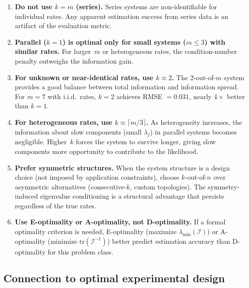 \documentclass[12pt]{article}
\theoremstyle{definition}
\theoremstyle{remark}
\newcommand{\tr}{\mathrm{tr}}
\begin{document}
\begin{enumerate}
  \item \textbf{Do not use $k = m$ (series).}  Series systems are
    non-identifiable for individual rates.  Any apparent estimation
    success from series data is an artifact of the evaluation metric.

  \item \textbf{Parallel ($k = 1$) is optimal only for small systems
    ($m \le 3$) with similar rates.}  For larger~$m$ or heterogeneous
    rates, the condition-number penalty outweighs the information gain.

  \item \textbf{For unknown or near-identical rates, use
    $k \approx 2$.}  The 2-out-of-$m$ system provides a good balance
    between total information and information spread.  For $m = 7$
    with i.i.d.\ rates, $k = 2$ achieves RMSE $= 0.031$, nearly
    $4\times$ better than $k = 1$.

  \item \textbf{For heterogeneous rates, use
    $k \approx \lceil m/3 \rceil$.}  As heterogeneity increases, the
    information about slow components (small $\lambda_j$) in parallel
    systems becomes negligible.  Higher~$k$ forces the system to
    survive longer, giving slow components more opportunity to
    contribute to the likelihood.

  \item \textbf{Prefer symmetric structures.}  When the system
    structure is a design choice (not imposed by application
    constraints), choose $k$-out-of-$n$ over asymmetric alternatives
    (consecutive-$k$, custom topologies).  The symmetry-induced
    eigenvalue conditioning is a structural advantage that persists
    regardless of the true rates.

  \item \textbf{Use E-optimality or A-optimality, not D-optimality.}
    If a formal optimality criterion is needed, E-optimality
    (maximize $\lambda_{\min}(\mathcal{I})$) or A-optimality
    (minimize $\tr(\mathcal{I}^{-1})$) better predict estimation
    accuracy than D-optimality for this problem class.
\end{enumerate}


\subsection{Connection to optimal experimental design}
\label{sec:design_connection}
\end{document}
